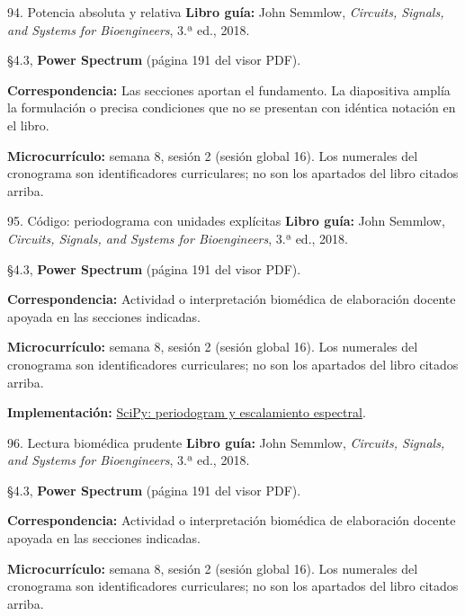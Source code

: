 \documentclass[
  10pt,
  ignorenonframetext,
  aspectratio=169,
  spanish,
]{beamer}
\begin{document}
\begin{frame}{94. Potencia absoluta y relativa}
\label{potencia-absoluta-y-relativa}
\textbf{Libro guía:} John Semmlow, \emph{Circuits, Signals, and Systems
for Bioengineers}, 3.ª ed., 2018.

§4.3, \textbf{Power Spectrum} (página 191 del visor PDF).

\textbf{Correspondencia:} Las secciones aportan el fundamento. La
diapositiva amplía la formulación o precisa condiciones que no se
presentan con idéntica notación en el libro.

\textbf{Microcurrículo:} semana 8, sesión 2 (sesión global 16). Los
numerales del cronograma son identificadores curriculares; no son los
apartados del libro citados arriba.
\end{frame}

\begin{frame}{95. Código: periodograma con unidades explícitas}
\label{cuxf3digo-periodograma-con-unidades-expluxedcitas}
\textbf{Libro guía:} John Semmlow, \emph{Circuits, Signals, and Systems
for Bioengineers}, 3.ª ed., 2018.

§4.3, \textbf{Power Spectrum} (página 191 del visor PDF).

\textbf{Correspondencia:} Actividad o interpretación biomédica de
elaboración docente apoyada en las secciones indicadas.

\textbf{Microcurrículo:} semana 8, sesión 2 (sesión global 16). Los
numerales del cronograma son identificadores curriculares; no son los
apartados del libro citados arriba.

\textbf{Implementación:}
\href{https://docs.scipy.org/doc/scipy/reference/generated/scipy.signal.periodogram.html}{SciPy:
periodogram y escalamiento espectral}.
\end{frame}

\begin{frame}{96. Lectura biomédica prudente}
\label{lectura-biomuxe9dica-prudente}
\textbf{Libro guía:} John Semmlow, \emph{Circuits, Signals, and Systems
for Bioengineers}, 3.ª ed., 2018.

§4.3, \textbf{Power Spectrum} (página 191 del visor PDF).

\textbf{Correspondencia:} Actividad o interpretación biomédica de
elaboración docente apoyada en las secciones indicadas.

\textbf{Microcurrículo:} semana 8, sesión 2 (sesión global 16). Los
numerales del cronograma son identificadores curriculares; no son los
apartados del libro citados arriba.
\end{frame}
\end{document}
